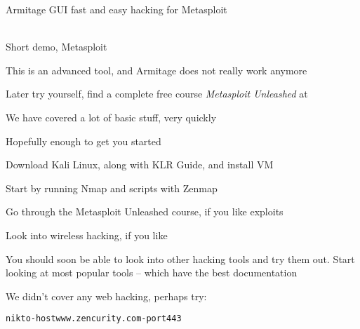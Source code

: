 \documentclass[Screen16to9,17pt]{foils}
\begin{document}
\begin{list1}


\item Armitage GUI fast and easy hacking for Metasploit\\
\\
\end{list1}



\begin{list2}
\item Short demo, Metasploit
\item This is an advanced tool, and Armitage does not really work anymore
\item Later try yourself, find a complete free course \emph{Metasploit Unleashed}
at 
\end{list2}




\begin{quote}

\end{quote}

\begin{list1}
\item We have covered a lot of basic stuff, very quickly
\item Hopefully enough to get you started
\begin{list2}
\item Download Kali Linux, along with KLR Guide, and install VM
\item Start by running Nmap and scripts with Zenmap
\item Go through the Metasploit Unleashed course, if you like exploits
\item Look into wireless hacking, if you like
\item You should soon be able to look into other hacking tools and try them out. Start looking at most popular tools -- which have the best documentation
\end{list2}
\end{list1}

We didn't cover any web hacking, perhaps try:
\begin{alltt}
  nikto -host www.zencurity.com -port 443
\end{alltt}
\end{document}
